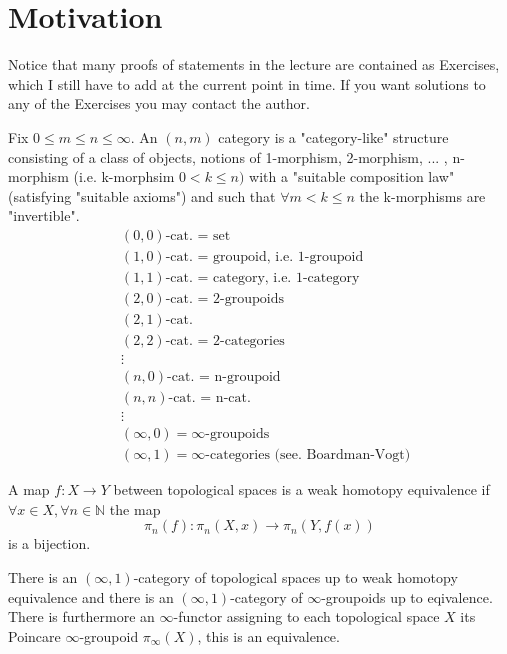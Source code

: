 \section{Motivation}

Notice that many proofs of statements in the lecture are contained as Exercises, which I still have to add at the current point in time.
If you want solutions to any of the Exercises you may contact the author.

Fix $ 0 \leq m \leq n \leq \infty $. 
An $ ( n , m ) $ category is a "category-like" structure consisting of a class of objects, notions of 1-morphism, 2-morphism, ... , n-morphism (i.e. k-morphsim $ 0 < k \leq n )$ with a "suitable composition law" (satisfying "suitable axioms") and such that $ \forall m < k \leq n $ the k-morphisms are "invertible".
\begin{align*}
    &( 0 , 0 ) \text{-cat. = set}
    \\
    &( 1 , 0 ) \text{-cat. = groupoid, i.e. 1-groupoid}
    \\
    &( 1 , 1 ) \text{-cat. = category, i.e. 1-category}
    \\
    &( 2 , 0 ) \text{-cat. = 2-groupoids}
    \\
    &( 2 , 1 ) \text{-cat.}
    \\
    &( 2 , 2 ) \text{-cat. = 2-categories}
    \\
    &\vdots
    \\
    &( n , 0 ) \text{-cat. = n-groupoid}
    \\
    &( n , n ) \text{-cat. = n-cat.}
    \\
    &\vdots
    \\
    &( \infty , 0 ) = \infty \text{-groupoids}
    \\
    &( \infty , 1 ) = \infty \text{-categories (see. Boardman-Vogt)}
\end{align*}

\begin{rmd}
    A map $ f \colon X \to Y $ between topological spaces is a weak homotopy equivalence if $ \forall x \in X, \forall n \in \mathbb{ N } $ the map
    \[
        \pi_n ( f ) \colon \pi_n ( X , x ) \xrightarrow{} \pi_n ( Y , f ( x ) ) 
    \]
    is a bijection.
\end{rmd}

\begin{thm}
    There is an $ ( \infty , 1 ) $-category of topological spaces up to weak  homotopy equivalence and there is an $ ( \infty , 1 ) $-category of $ \infty $-groupoids up to eqivalence.
    There is furthermore an $ \infty $-functor assigning to each topological space $ X $ its Poincare $ \infty $-groupoid $ \pi_{ \infty } ( X ) $, this is an equivalence.
\end{thm}

